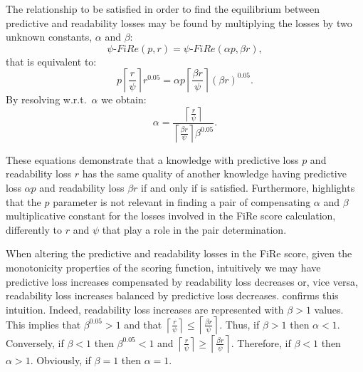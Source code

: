 \documentclass{article}
\newcommand{\fire}{FiRe}
\begin{document}
The relationship to be satisfied in order to find the equilibrium between predictive and readability losses may be found by multiplying the losses by two unknown constants, $\alpha$ and $\beta$:
%
\begin{equation}\label{eq:equi1}
	\psi\textrm{-}\fire(p, r) = \psi\textrm{-}\fire(\alpha p, \beta r),
\end{equation}
%
that is equivalent to:
%
\begin{equation}\label{eq:equi2}
	p \left \lceil{\frac{r}{\psi}}\right \rceil r^{0.05} = \alpha p \left \lceil{\frac{\beta r}{\psi}}\right \rceil (\beta r)^{0.05}.
\end{equation}
%
By resolving w.r.t.\ $\alpha$ we obtain:
%
\begin{equation}\label{eq:alpha}
	\alpha = \frac{\left \lceil{\frac{r}{\psi}}\right \rceil}{\left \lceil{\frac{\beta r}{\psi}}\right \rceil \beta^{0.05}}.
\end{equation}


These equations demonstrate that a knowledge with predictive loss $p$ and readability loss $r$ has the same quality of another knowledge having predictive loss $\alpha p$ and readability loss $\beta r$ if and only if  is satisfied.
%
Furthermore,  highlights that the $p$ parameter is not relevant in finding a pair of compensating $\alpha$ and $\beta$ multiplicative constant for the losses involved in the \fire{} score calculation, differently to $r$ and $\psi$ that play a role in the pair determination.

When altering the predictive and readability losses in the \fire{} score, given the monotonicity properties of the scoring function, intuitively we may have predictive loss increases compensated by readability loss decreases or, vice versa, readability loss increases balanced by predictive loss decreases.
%
 confirms this intuition.
%
Indeed, readability loss increases are represented with $\beta > 1$ values.
%
This implies that $\beta^{0.05} > 1$ and that $\left \lceil{\frac{r}{\psi}}\right \rceil \leq \left \lceil{\frac{\beta r}{\psi}}\right \rceil$.
%
Thus, if $\beta > 1$ then $\alpha < 1$.
%
Conversely, if $\beta < 1$ then $\beta^{0.05} < 1$ and $\left \lceil{\frac{r}{\psi}}\right \rceil \geq \left \lceil{\frac{\beta r}{\psi}}\right \rceil$.
%
Therefore, if $\beta < 1$ then $\alpha > 1$.
%
Obviously, if $\beta = 1$ then $\alpha = 1$.
\end{document}
